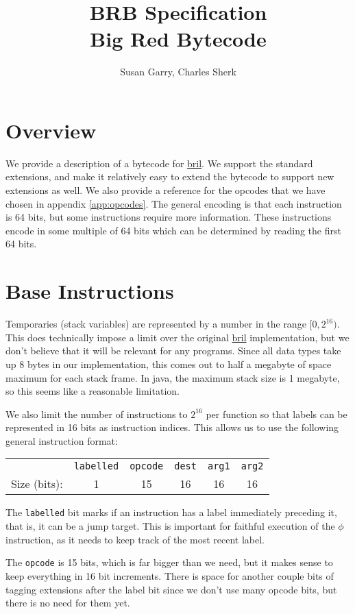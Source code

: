 \documentclass{article}
\title{BRB Specification \\
\Large{Big Red Bytecode}}
\author{Susan Garry, Charles Sherk}
\newcommand{\bril}{\href{https://capra.cs.cornell.edu/bril/}{bril}}
\begin{document}
\maketitle
\section{Overview}
We provide a description of a bytecode for \bril{}. We support the standard
extensions, and make it relatively easy to extend the bytecode to support new
extensions as well. We also provide a reference for the opcodes that we have
chosen in appendix \ref{app:opcodes}. The general encoding is that each
instruction is 64 bits, but some instructions require more information. These
instructions encode in some multiple of 64 bits which can be determined by
reading the first 64 bits.
\section{Base Instructions}
Temporaries (stack variables) are represented by a number in the range
$[0, 2^{16})$. This does technically impose a limit over the original \bril{}
implementation, but we don't believe that it will be relevant for any
programs. Since all data types take up 8 bytes in our implementation, this comes
out to half a megabyte of space maximum for each stack frame. In java, the
maximum stack size is 1 megabyte, so this seems like a reasonable limitation.

We also limit the number of instructions to $2^{16}$ per function so that labels
can be represented in 16 bits as instruction indices. This allows us to use the
following general instruction format:\\
\begin{center}
  \begin{tabular}{r|c|c|c|c|c|}
    \cline{2-6}
    & \texttt{labelled} & \texttt{opcode} & \texttt{dest} & \texttt{arg1}
    & \texttt{arg2} \\ \cline{2-6}
    Size (bits): & 1 & 15 & 16 & 16 & 16 \\ \cline{2-6}
  \end{tabular}
\end{center}
The \texttt{labelled} bit marks if an instruction has a label immediately preceding
it, that is, it can be a jump target. This is important for faithful execution
of the $\phi$ instruction, as it needs to keep track of the most recent label.

The \texttt{opcode} is 15 bits, which is far bigger than we need, but it makes
sense to keep everything in 16 bit increments. There is space for another couple
bits of tagging extensions after the label bit since we don't use many opcode
bits, but there is no need for them yet.
\end{document}
